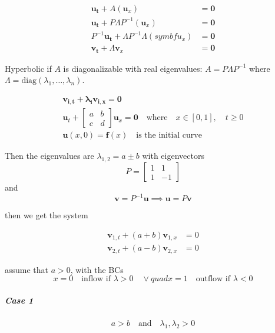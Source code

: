 \begin{align*}
  \symbf{u_t} + A(\symbf{u}_x)                          & = \symbf{0} \\
  \symbf{u_t} + P\Lambda P^{-1}(\symbf{u}_x)            & = \symbf{0} \\
  P^{-1}\symbf{u_t} + \Lambda P^{-1}\Lambda(symbf{u}_x) & = \symbf{0} \\
  \symbf{v_t} + \Lambda \symbf{v}_x                     & = \symbf{0}
\end{align*}

Hyperbolic if \(A\) is diagonalizable with real eigenvalues: \(A = P\Lambda P^{-1}\) where \(\Lambda = \text{diag}(\lambda_1, \ldots, \lambda_n)\).

\begin{example}{}{}
  \begin{align*}
    \symbf{v_{i,t} + \lambda_i v_{i,x} = 0}                                     \\
    \symbf{u}_t +
    \begin{bmatrix}
      a & b \\
      c & d
    \end{bmatrix}
    \symbf{u}_x = \symbf{0} \quad \text{where} \quad x\in [0,1], \quad t \geq 0 \\
    \symbf{u}(x,0) = \symbf{f}(x) \quad \text{is the initial curve}
  \end{align*}

  Then the eigenvalues are \(\lambda_{1,2} = a \pm b\) with eigenvectors
  \[
    P = \begin{bmatrix}
      1 & 1  \\
      1 & -1
    \end{bmatrix}
  \]
  and
  \[
    \symbf{v} = P^{-1}\symbf{u} \implies \symbf{u} = P\symbf{v}
  \]

  then we get the system

  \begin{align*}
    \symbf{v}_{1,t} + (a + b)\symbf{v}_{1,x} & = 0 \\
    \symbf{v}_{2,t} + (a - b)\symbf{v}_{2,x} & = 0
  \end{align*}

  assume that \(a > 0\), with the BCs
  \[
    x=0 \quad \text{inflow if } \lambda > 0 \quad \vee quad x = 1 \quad \text{outflow if } \lambda < 0
  \]

  \subparagraph{Case 1}
  \[
    a > b \quad \text{and} \quad \lambda_1, \lambda_2 > 0
  \]



\end{example}


